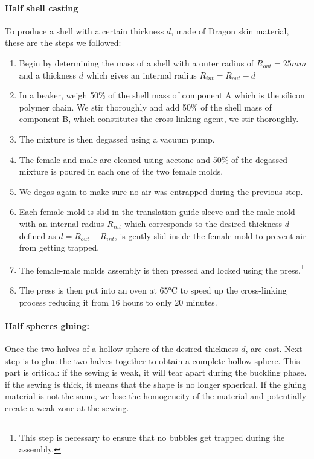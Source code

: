 \paragraph{Half shell casting}
To produce a shell with a certain thickness $d$, made of Dragon skin material, these are the steps we followed: 
\begin{enumerate}
	\item Begin by determining the mass of a shell with a outer radius of $R_{out}= 25 mm$ and a thickness $d$ which gives an internal radius $R_{int} = R_{out}-d$

	\item In a beaker, weigh 50\% of the shell mass of component A which is the silicon polymer chain. We stir thoroughly and add 50\% of the shell mass of component B, which constitutes the cross-linking agent, we stir thoroughly.
	\item The mixture is then degassed using a vacuum pump.
	\item The female and male are cleaned using acetone and 50\% of the degassed mixture is poured in each one of the two female molds.
	\item We degas again to make sure no air was entrapped during the previous step.
	\item Each female mold is slid in the translation guide sleeve and the male mold with an internal radius $ R_{int}$ which corresponds to the desired thickness $d$ defined as $d = R_{out}-R_{int}$, is gently slid inside the female mold to prevent air from getting trapped.
	\item The female-male molds assembly is then pressed and locked using the press.\footnote{This step is necessary to ensure that no bubbles get trapped during the assembly.}
	\item The press is then put into an oven at 65°C to speed up the cross-linking process reducing it from 16 hours to only 20 minutes.
	
\end{enumerate}

\paragraph{Half spheres gluing:}
Once the two halves of a hollow sphere of the desired thickness $d$, are cast. Next step is to glue the two halves together to obtain a complete hollow sphere.
This part is critical: if the sewing is weak, it will tear apart during the buckling phase. if the sewing is thick, it means that the shape is no longer spherical. If the gluing material is not the same, we lose the homogeneity of the material and potentially create a weak zone at the sewing.
